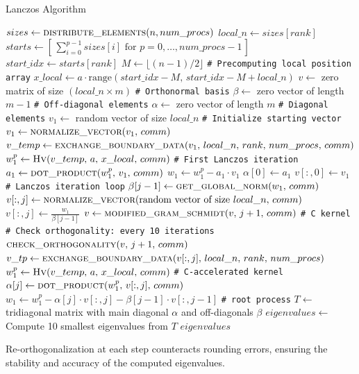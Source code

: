 \documentclass[12pt,a4paper]{report}
\begin{document}
\begin{algorithm}
\caption{Lanczos Algorithm}\label{euclid}
\begin{algorithmic}[1]
    \State $sizes \gets \Call{distribute\_elements}{n, num\_procs}$
    \State $local\_n \gets sizes[rank]$
    \State $starts \gets [\,\sum_{i=0}^{p-1} sizes[i] \text{ for } p=0,\dots,num\_procs-1\,]$
    \State $start\_idx \gets starts[rank]$
    \State $M \gets \lfloor (n-1)/2 \rfloor$ \; \texttt{\# Precomputing local position array}
    \State $x\_local \gets a \cdot \text{range}(start\_idx - M,\, start\_idx - M + local\_n)$
    \State $v \gets$ zero matrix of size $(local\_n \times m)$ \; \texttt{\# Orthonormal basis}
    \State $\beta \gets$ zero vector of length $m-1$ \; \texttt{\# Off-diagonal elements}
    \State $\alpha \gets$ zero vector of length $m$ \; \texttt{\# Diagonal elements}
    \State $v_1 \gets$ random vector of size $local\_n$ \; \texttt{\# Initialize starting vector}
    \State $v_1 \gets \Call{normalize\_vector}{v_1,\, comm}$
    \State $v\_temp \gets \Call{exchange\_boundary\_data}{v_1,\, local\_n,\, rank,\, num\_procs,\, comm}$
    \State $w_1^p \gets \Call{Hv}{v\_temp,\, a,\, x\_local,\, comm}$ \; \texttt{\# First Lanczos iteration}
    \State $a_1 \gets \Call{dot\_product}{w_1^p,\, v_1,\, comm}$
    \State $w_1 \gets w_1^p - a_1 \cdot v_1$
    \State $\alpha[0] \gets a_1$
    \State $v[:,0] \gets v_1$
     \; \texttt{\# Lanczos iteration loop}
        \State $\beta[j-1] \gets \Call{get\_global\_norm}{w_1,\, comm}$
            \State $v[:,j] \gets \Call{normalize\_vector}{\text{random vector of size } local\_n,\, comm}$
        \Else
            \State $v[:,j] \gets \frac{w_1}{\beta[j-1]}$
        \EndIf
        \State $v \gets \Call{modified\_gram\_schmidt}{v,\, j+1,\, comm}$ \; \texttt{\# C kernel}
         \; \texttt{\# Check orthogonality: every 10 iterations}
            \State $\Call{check\_orthogonality}{v,\, j+1,\, comm}$
        \EndIf
        \State $v\_tp \gets \Call{exchange\_boundary\_data}{v[:,j],\, local\_n,\, rank,\, num\_procs}$
        \State $w_1^p \gets \Call{Hv}{v\_temp,\, a,\, x\_local,\, comm}$ \; \texttt{\# C-accelerated kernel}
        \State $\alpha[j] \gets \Call{dot\_product}{w_1^p,\, v[:,j],\, comm}$
        \State $w_1 \gets w_1^p - \alpha[j]\cdot v[:,j] - \beta[j-1]\cdot v[:,j-1]$
    \EndFor
     \; \texttt{\# root process}
        \State $T \gets$ tridiagonal matrix with main diagonal $\alpha$ and off-diagonals $\beta$
        \State $eigenvalues \gets$ Compute 10 smallest eigenvalues from $T$
    \EndIf
    \State \Return $eigenvalues$
\EndProcedure
\end{algorithmic}
\end{algorithm}
Re-orthogonalization at each step counteracts rounding errors, ensuring the stability and accuracy of the computed eigenvalues.
\end{document}
